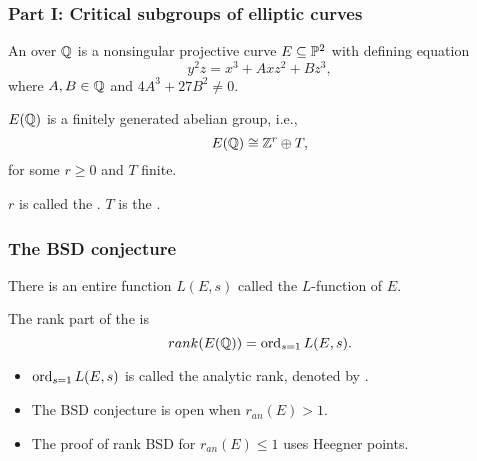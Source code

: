 \documentclass[handout]{beamer}
\begin{document}
\begin{frame}
\frametitle{Part I: Critical subgroups of elliptic curves}
\begin{Def}
An  over $\mathbb{Q}$ is a nonsingular projective curve $E \subseteq \mathbb{P}^2$ with defining equation 
\begin{equation*}
y^2z = x^3 + Axz^2+Bz^3, 
\end{equation*}
where $A,B \in \mathbb{Q}$ and  $4A^3+27B^2 \neq 0$.
\end{Def}



\pause

\begin{theorem}
$E(\mathbb{Q})$ is a finitely generated abelian group, i.e., $$E(\mathbb{Q}) \cong \mathbb{Z}^r \oplus T,$$
for some $r \geq 0$ and $T$ finite. 
\end{theorem}
$r$ is called the . $T$ is the . 

\end{frame}



\begin{frame}
\frametitle{The BSD conjecture} 


There is an entire function $L(E,s)$ called the $L$-function of $E$.  \\

\medskip
\pause

The rank part of the   is
\begin{equation*}
	rank(E(\mathbb{Q})) = \operatorname{ord}_{s=1}L(E,s).
\end{equation*}

\pause
\medskip

\begin{itemize}
\item $\operatorname{ord}_{s=1}L(E,s)$ is called the analytic rank, denoted by . \\
\item The BSD conjecture is open when $r_{an}(E) > 1$. \\
\item The proof of rank BSD for $r_{an}(E) \leq 1$ uses Heegner points. 
\end{itemize}

\end{frame}
\end{document}
